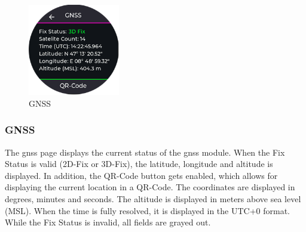 \begin{minipage}{\linewidth}
	\begin{figure}
		\vspace{-0.6cm}
		\includegraphics[width=4cm]{images/6_design_final/gui/06_gnss.png}
		\centering
		\caption{GNSS}
		\label{fig:final_design_gui_gnss}
	\end{figure}
	\subsubsection{GNSS}
	The \acrshort{gnss} page displays the current status of the \acrshort{gnss} module.
	When the Fix Status is valid (2D-Fix or 3D-Fix), the latitude, longitude and altitude is displayed.
	In addition, the QR-Code button gets enabled, which allows for displaying the current location in a QR-Code.
	The coordinates are displayed in degrees, minutes and seconds.
	The altitude is displayed in meters above sea level (MSL).
	When the time is fully resolved, it is displayed in the UTC+0 format.
	While the Fix Status is invalid, all fields are grayed out.
\end{minipage}
\vspace{0.0cm}

